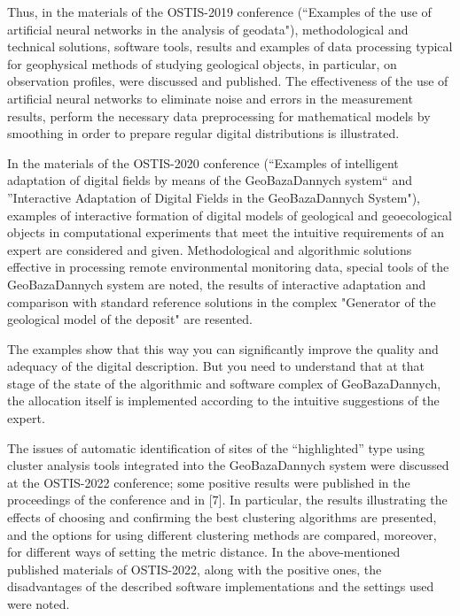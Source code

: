 \documentclass[8pt, a4paper]{article} %
\begin{document}
\begin{multicols}{2}
\fontsize{10}{14}
\selectfont
\quad Thus, in the materials of the OSTIS-2019 conference (“Examples of the use of artificial neural networks in the analysis of geodata"), methodological and technical solutions, software tools, results and examples of data processing typical for geophysical methods of studying geological objects, in particular, on observation profiles, were discussed and published. The effectiveness of the use of artificial neural networks to eliminate noise and
errors in the measurement results, perform the necessary data preprocessing for mathematical models by smoothing in order to prepare regular digital distributions is illustrated.

\fontsize{10}{14}
\selectfont
\quad In the materials of the OSTIS-2020 conference (“Examples of intelligent adaptation of digital fields by means of the GeoBazaDannych system“ and ”Interactive Adaptation of Digital Fields in the GeoBazaDannych System"), examples of interactive formation of digital models of geological and geoecological objects in computational experiments that meet the intuitive requirements of an expert are considered and given. Methodological and algorithmic solutions effective in processing remote environmental monitoring data, special tools of the GeoBazaDannych system are noted, the results of interactive adaptation and comparison with standard reference solutions in the complex "Generator of the geological model of the deposit" are resented.

\fontsize{10}{14}
\selectfont
\quad The examples show that this way you can significantly improve the quality and adequacy of the digital description. But you need to understand that at that stage of the state of the algorithmic and software complex of GeoBazaDannych, the allocation itself is implemented according to the intuitive suggestions of the expert.

\fontsize{10}{14}
\selectfont
\quad The issues of automatic identification of sites of the “highlighted” type using cluster analysis tools integrated into the GeoBazaDannych system were discussed at the OSTIS-2022 conference; some positive results were published in the proceedings of the conference and in [7]. In particular, the results illustrating the effects of choosing and confirming the best clustering algorithms are presented, and the options for using different clustering methods are compared, moreover, for different ways of setting the metric distance. In the above-mentioned published materials of OSTIS-2022, along with the positive ones, the disadvantages of the described software
implementations and the settings used were noted.


\end{multicols}
\end{document}
